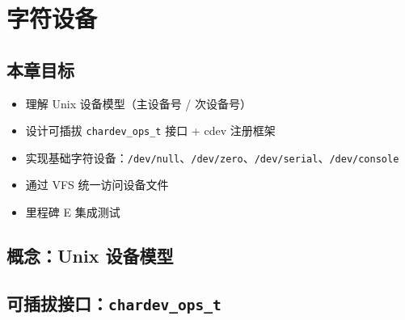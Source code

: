 \chapter{字符设备}
\label{ch:devfs}

\section{本章目标}

\begin{itemize}
  \item 理解 Unix 设备模型（主设备号 / 次设备号）
  \item 设计可插拔 \texttt{chardev\_ops\_t} 接口 + cdev 注册框架
  \item 实现基础字符设备：\texttt{/dev/null}、\texttt{/dev/zero}、\texttt{/dev/serial}、\texttt{/dev/console}
  \item 通过 VFS 统一访问设备文件
  \item 里程碑 E 集成测试
\end{itemize}

\section{概念：Unix 设备模型}
\label{sec:devfs-concept}


\section{可插拔接口：\texttt{chardev\_ops\_t}}
\label{sec:devfs-interface}


